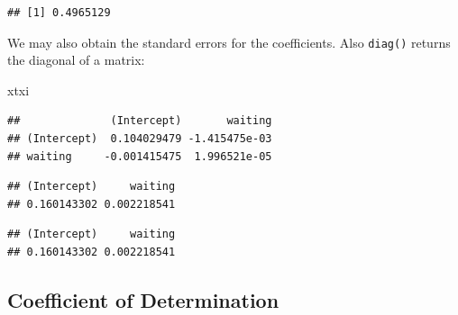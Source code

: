 \documentclass[]{article}
\newenvironment{Shaded}{\begin{snugshade}}{\end{snugshade}}
\newcommand{\KeywordTok}[1]{\textcolor[rgb]{0.13,0.29,0.53}{\textbf{{#1}}}}
\newcommand{\DecValTok}[1]{\textcolor[rgb]{0.00,0.00,0.81}{{#1}}}
\newcommand{\StringTok}[1]{\textcolor[rgb]{0.31,0.60,0.02}{{#1}}}
\newcommand{\CommentTok}[1]{\textcolor[rgb]{0.56,0.35,0.01}{\textit{{#1}}}}
\newcommand{\NormalTok}[1]{{#1}}
\numberwithin{equation}{section}
\begin{document}
\begin{Shaded}
\end{Shaded}

\begin{verbatim}
## [1] 0.4965129
\end{verbatim}

We may also obtain the standard errors for the coefficients. Also
\texttt{diag()} returns the diagonal of a matrix:

\begin{Shaded}
\begin{Highlighting}[]
\NormalTok{xtxi }
\end{Highlighting}
\end{Shaded}

\begin{verbatim}
##              (Intercept)       waiting
## (Intercept)  0.104029479 -1.415475e-03
## waiting     -0.001415475  1.996521e-05
\end{verbatim}

\begin{Shaded}
\end{Shaded}

\begin{verbatim}
## (Intercept)     waiting 
## 0.160143302 0.002218541
\end{verbatim}

\begin{Shaded}
\end{Shaded}

\begin{verbatim}
## (Intercept)     waiting 
## 0.160143302 0.002218541
\end{verbatim}

\subsection{Coefficient of
Determination}\label{coefficient-of-determination}
\end{document}

